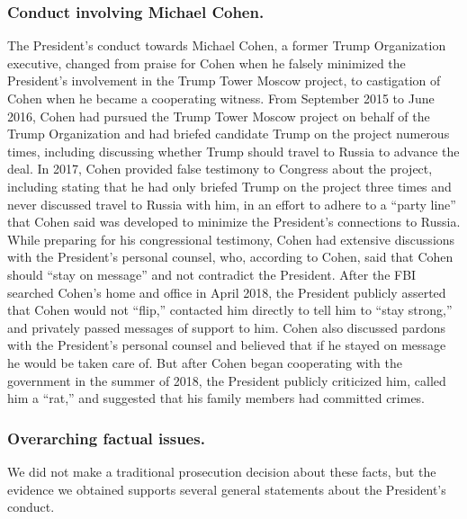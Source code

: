 \subsubsection*{Conduct involving Michael Cohen.}

The President's conduct towards Michael Cohen, a former Trump Organization executive, changed from praise for Cohen when he falsely minimized the President's involvement in the Trump Tower Moscow project, to castigation of Cohen when he became a cooperating witness.
From September 2015 to June 2016, Cohen had pursued the Trump Tower Moscow project on behalf of the Trump Organization and had briefed candidate Trump on the project numerous times, including discussing whether Trump should travel to Russia to advance the deal.
In 2017, Cohen provided false testimony to Congress about the project, including stating that he had only briefed Trump on the project three times and never discussed travel to Russia with him, in an effort to adhere to a ``party line'' that Cohen said was developed to minimize the President's connections to Russia.
While preparing for his congressional testimony, Cohen had extensive discussions with the President's personal counsel, who, according to Cohen, said that Cohen should ``stay on message'' and not contradict the President.
After the FBI searched Cohen's home and office in April 2018, the President publicly asserted that Cohen would not ``flip,'' contacted him directly to tell him to ``stay strong,'' and privately passed messages of support to him.
Cohen also discussed pardons with the President's personal counsel and believed that if he stayed on message he would be taken care of.
But after Cohen began cooperating with the government in the summer of 2018, the President publicly criticized him, called him a ``rat,'' and suggested that his family members had committed crimes.

\subsubsection*{Overarching factual issues.}

We did not make a traditional prosecution decision about these facts, but the evidence we obtained supports several general statements about the President's conduct.

